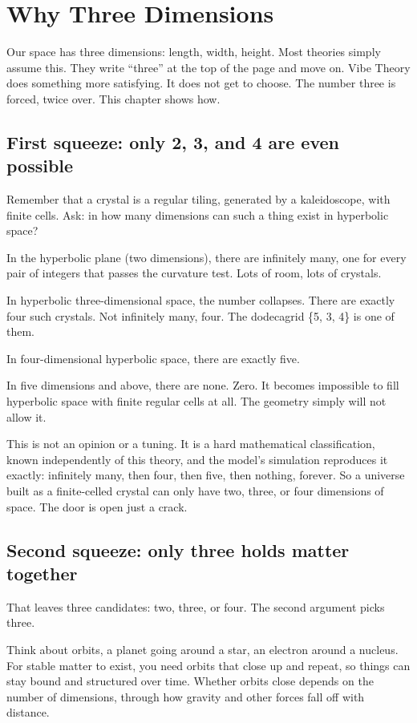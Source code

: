 \section{Why Three Dimensions}

Our space has three dimensions: length, width, height. Most theories simply assume this. They write ``three'' at the top of the page and move on. Vibe Theory does something more satisfying. It does not get to choose. The number three is forced, twice over. This chapter shows how.

\subsection{First squeeze: only 2, 3, and 4 are even possible}

Remember that a crystal is a regular tiling, generated by a kaleidoscope, with finite cells. Ask: in how many dimensions can such a thing exist in hyperbolic space?

In the hyperbolic plane (two dimensions), there are infinitely many, one for every pair of integers that passes the curvature test. Lots of room, lots of crystals.

In hyperbolic three-dimensional space, the number collapses. There are exactly four such crystals. Not infinitely many, four. The dodecagrid \{5, 3, 4\} is one of them.

In four-dimensional hyperbolic space, there are exactly five.

In five dimensions and above, there are none. Zero. It becomes impossible to fill hyperbolic space with finite regular cells at all. The geometry simply will not allow it.

This is not an opinion or a tuning. It is a hard mathematical classification, known independently of this theory, and the model's simulation reproduces it exactly: infinitely many, then four, then five, then nothing, forever. So a universe built as a finite-celled crystal can only have two, three, or four dimensions of space. The door is open just a crack.

\subsection{Second squeeze: only three holds matter together}

That leaves three candidates: two, three, or four. The second argument picks three.

Think about orbits, a planet going around a star, an electron around a nucleus. For stable matter to exist, you need orbits that close up and repeat, so things can stay bound and structured over time. Whether orbits close depends on the number of dimensions, through how gravity and other forces fall off with distance.

